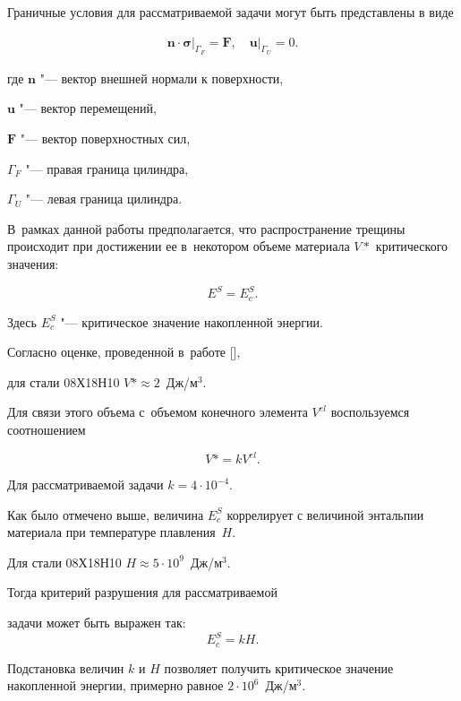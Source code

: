 Граничные условия для рассматриваемой задачи могут быть представлены в виде

\begin{gather*}

\boldsymbol{n}\cdot\boldsymbol{\sigma}\big|_{\Gamma_{F}}=\boldsymbol{F},\quad 

\boldsymbol{u}\big|_{\Gamma_{U}}=0.

\end{gather*}

где  $\boldsymbol{n}$ "--- вектор внешней нормали к поверхности, 

$\boldsymbol{u}$ "--- вектор перемещений, 

$\boldsymbol{F}$ "--- вектор поверхностных сил, 

$\Gamma_{F}$ "---  правая граница цилиндра, 

$\Gamma_{U}$ "--- левая граница цилиндра.

В~рамках данной работы предполагается, что распространение трещины происходит при достижении ее в~некотором объеме материала $V*$ критического значения:

\begin{equation}

E^{S}=E^{S}_{c}. \label{eq:kov:Criterion}

\end{equation}

Здесь $E^{S}_{c}$ "--- критическое значение накопленной энергии. 

Согласно оценке, проведенной в~работе [],

для стали 08Х18Н10  $V* \approx 2$~Дж/м$^3$. 

Для связи этого объема с~объемом конечного элемента $V^{el}$ воспользуемся соотношением

$$V*=kV^{el}.$$ 

Для рассматриваемой задачи $k=4\cdot10^{-4}$. 

Как было отмечено выше, величина $E^{S}_{c}$ коррелирует с величиной энтальпии материала при температуре плавления~$H$. 

Для стали 08Х18Н10 $H \approx 5\cdot10^{9}$~Дж/м$^3$. 

Тогда критерий разрушения для рассматриваемой

задачи может быть выражен так: $$E^{S}_{c}=kH.$$ 

Подстановка величин $k$ и $H$ позволяет получить критическое значение накопленной энергии, примерно равное $2\cdot10^6$~Дж/м$^{3}$.



